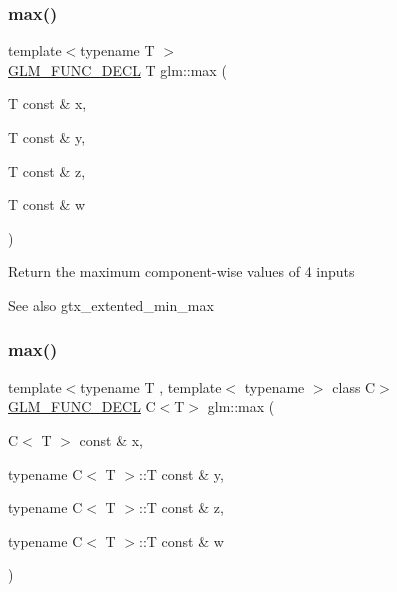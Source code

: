 \subsubsection{\texorpdfstring{max()}{max()}\hspace{0.1cm}{\footnotesize\ttfamily [4/6]}}
{\footnotesize\ttfamily template$<$typename T $>$ \\
\hyperlink{setup_8hpp_ab2d052de21a70539923e9bcbf6e83a51}{G\+L\+M\+\_\+\+F\+U\+N\+C\+\_\+\+D\+E\+CL} T glm\+::max (\begin{DoxyParamCaption}\item[{T const \&}]{x,  }\item[{T const \&}]{y,  }\item[{T const \&}]{z,  }\item[{T const \&}]{w }\end{DoxyParamCaption})}

Return the maximum component-\/wise values of 4 inputs \begin{DoxySeeAlso}{See also}
gtx\+\_\+extented\+\_\+min\+\_\+max 
\end{DoxySeeAlso}
\mbox{\label{group__gtx__extended__min__max_ga7cca8b53cfda402040494cdf40fbdf4a}} 
\subsubsection{\texorpdfstring{max()}{max()}\hspace{0.1cm}{\footnotesize\ttfamily [5/6]}}
{\footnotesize\ttfamily template$<$typename T , template$<$ typename $>$ class C$>$ \\
\hyperlink{setup_8hpp_ab2d052de21a70539923e9bcbf6e83a51}{G\+L\+M\+\_\+\+F\+U\+N\+C\+\_\+\+D\+E\+CL} C$<$T$>$ glm\+::max (\begin{DoxyParamCaption}\item[{C$<$ T $>$ const \&}]{x,  }\item[{typename C$<$ T $>$\+::T const \&}]{y,  }\item[{typename C$<$ T $>$\+::T const \&}]{z,  }\item[{typename C$<$ T $>$\+::T const \&}]{w }\end{DoxyParamCaption})}

